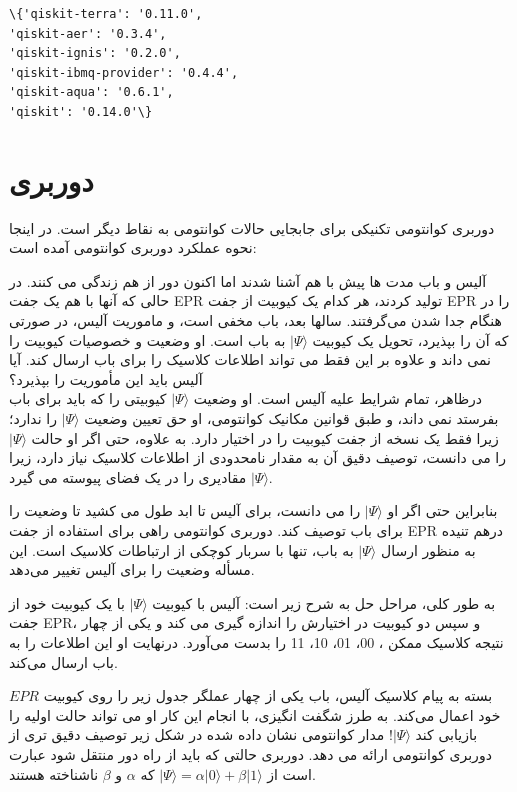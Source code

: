 \documentclass{book}
\begin{document}
\begin{tcolorbox}[width=13cm, colback=gray9, boxsep=10pt, halign=center]
\begin{Verbatim}[commandchars=\\\{\}]
\{'qiskit-terra': '0.11.0',
'qiskit-aer': '0.3.4',
'qiskit-ignis': '0.2.0',
'qiskit-ibmq-provider': '0.4.4',
'qiskit-aqua': '0.6.1',
'qiskit': '0.14.0'\}
\end{Verbatim}
\end{tcolorbox}

\section{دوربری}
دوربری کوانتومی تکنیکی برای جابجایی حالات کوانتومی به نقاط دیگر است. در اینجا نحوه عملکرد دوربری کوانتومی آمده است:

 آلیس و باب مدت ها پیش با هم آشنا شدند اما اکنون دور از هم زندگی می کنند. در حالی که آنها با هم یک جفت EPR تولید کردند، هر کدام یک کیوبیت از جفت EPR را در هنگام جدا شدن می‌گرفتند. سالها بعد، باب مخفی است، و ماموریت آلیس، در صورتی که آن را بپذیرد، تحویل یک کیوبیت $\vert \Psi \rangle$ به باب است. او وضعیت  و خصوصیات کیوبیت را نمی داند و علاوه بر این فقط می تواند اطلاعات کلاسیک را برای باب ارسال کند. آیا آلیس باید این مأموریت را بپذیرد؟\\


درظاهر، تمام شرایط علیه آلیس است. او وضعیت $\vert \Psi \rangle$ کیوبیتی را که باید برای باب بفرستد نمی داند، و طبق قوانین مکانیک کوانتومی، او حق تعیین وضعیت $\vert \Psi \rangle$ را ندارد؛‌زیرا فقط یک نسخه از جفت کیوبیت را در اختیار دارد. به علاوه، حتی اگر او حالت $\vert \Psi \rangle$ را می دانست، توصیف دقیق آن به مقدار نامحدودی از اطلاعات کلاسیک نیاز دارد، زیرا $\vert \Psi \rangle$ مقادیری را در یک فضای پیوسته می گیرد.

بنابراین حتی اگر او $\vert \Psi \rangle$ را می دانست، برای آلیس تا ابد طول می کشید تا وضعیت را برای باب توصیف کند. دوربری کوانتومی راهی برای استفاده از جفت EPR درهم تنیده به منظور ارسال $\vert \Psi \rangle$ به باب، تنها با سربار کوچکی از ارتباطات کلاسیک است. این مسأله وضعیت را برای آلیس تغییر می‌دهد.

به طور کلی، مراحل حل به شرح زیر است: آلیس با کیوبیت $\vert \Psi \rangle$ با یک کیوبیت خود از جفت EPR، و سپس دو کیوبیت در اختیارش را اندازه گیری می کند و یکی از چهار نتیجه کلاسیک ممکن
، 00، 01، 10، 11 را بدست می‌آورد. درنهایت او این اطلاعات را به باب ارسال می‌کند.


 بسته به پیام کلاسیک آلیس، باب یکی از چهار عملگر جدول زیر را روی کیوبیت $EPR$ خود اعمال می‌کند.
 به طرز شگفت انگیزی، با انجام این کار او می تواند حالت اولیه را بازیابی کند $\vert \Psi \rangle$! مدار کوانتومی نشان داده شده در شکل زیر توصیف دقیق تری از دوربری کوانتومی ارائه می دهد.
دوربری حالتی که باید از راه دور منتقل شود عبارت است از $\vert \Psi \rangle = \alpha \vert 0 \rangle + \beta \vert 1 \rangle$ که $\alpha$ و $\beta$ ناشناخته هستند.
\end{document}
